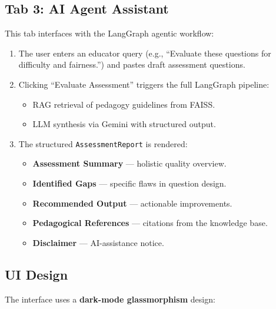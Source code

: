 \documentclass[12pt, a4paper, twoside]{article}
\newcommand{\code}[1]{\texttt{#1}}
\begin{document}
\subsection{Tab 3: AI Agent Assistant}

This tab interfaces with the LangGraph agentic workflow:

\begin{enumerate}[leftmargin=2em]
    \item The user enters an educator query (e.g., \enquote{Evaluate
          these questions for difficulty and fairness.}) and pastes
          draft assessment questions.
    \item Clicking \enquote{Evaluate Assessment} triggers the
          full LangGraph pipeline:
    \begin{itemize}
        \item RAG retrieval of pedagogy guidelines from FAISS.
        \item LLM synthesis via Gemini with structured output.
    \end{itemize}
    \item The structured \code{AssessmentReport} is rendered:
    \begin{itemize}
        \item \textbf{Assessment Summary} --- holistic quality overview.
        \item \textbf{Identified Gaps} --- specific flaws in question
              design.
        \item \textbf{Recommended Output} --- actionable improvements.
        \item \textbf{Pedagogical References} --- citations from the
              knowledge base.
        \item \textbf{Disclaimer} --- AI-assistance notice.
    \end{itemize}
\end{enumerate}

\subsection{UI Design}

The interface uses a \textbf{dark-mode glassmorphism} design:
\end{document}
